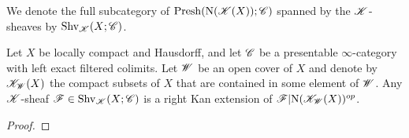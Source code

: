 \documentclass[../../thesis.tex]{subfiles}
\begin{document}
\begin{definition}
    We denote the full subcategory of $\mathrm{Presh}(\mathrm{N}(\mathscr{K}(X)); \mathscr{C})$ spanned by the $\mathscr{K}$-sheaves by $\mathrm{Shv}_{\mathscr{K}}(X;\mathscr{C})$.
\end{definition}
\begin{lemma}\label{7.3.4.8}
    Let $X$ be locally compact and Hausdorff, and let $\mathscr{C}$ be a presentable $\infty$-category with left exact filtered colimits.
    Let $\mathscr{W}$ be an open cover of $X$ and denote by $\mathscr{K}_{\mathscr{W}}(X)$ the compact subsets of $X$ that are contained in some element of $\mathscr{W}$.
    Any $\mathscr{K}$-sheaf $\mathscr{F}\in \mathrm{Shv}_{\mathscr{K}}(X;\mathscr{C})$ is a right Kan extension of $\mathscr{F}|\mathrm{N}(\mathscr{K}_{\mathscr{W}}(X))^{op}$.
\end{lemma}
\begin{proof}
\end{proof}
\end{document}
